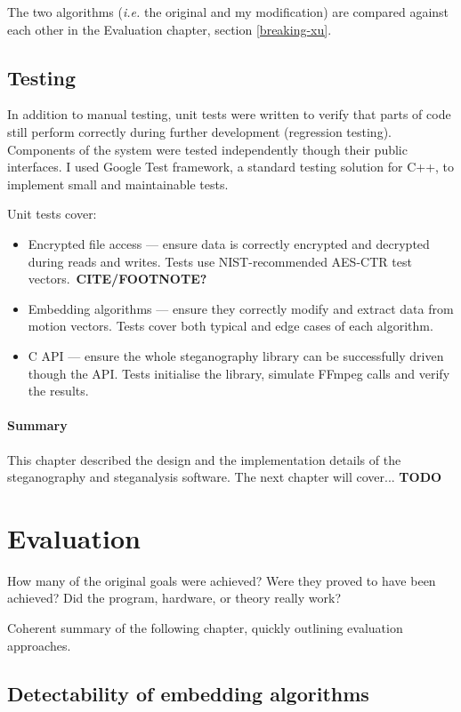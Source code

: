\documentclass[12pt,british,twoside,notitlepage,usenames,dvipsnames,hypens,final]{report}
\numberwithin{equation}{section}
\numberwithin{figure}{section}
\begin{document}
The two algorithms (\emph{i.e.} the original and my modification) are compared against each other in the Evaluation chapter, section \ref{breaking-xu}.

\section{Testing}

In addition to manual testing, unit tests were written to verify that parts of code  still perform correctly during further development (regression testing). Components of the system were tested independently though their public interfaces. I used Google Test framework, a standard testing solution for C++, to implement small and maintainable tests.

Unit tests cover:
\begin{itemize}
\item Encrypted file access --- ensure data is correctly encrypted and decrypted during reads and writes. Tests use NIST-recommended AES-CTR test vectors.~\textbf{CITE/FOOTNOTE?}
\item Embedding algorithms --- ensure they correctly modify and extract data from motion vectors. Tests cover both typical and edge cases of each algorithm.
\item C API --- ensure the whole steganography library can be successfully driven though the API. Tests initialise the library, simulate FFmpeg calls and verify the results. 
\end{itemize}

\bigskip\bigskip
\subsubsection*{Summary}
This chapter described the design and the implementation details of the steganography and steganalysis software. The next chapter will cover... \textbf{TODO}

\cleardoublepage
\chapter{Evaluation}

How many of the
original goals were achieved? Were they proved to have been achieved? Did the program,
hardware, or theory really work?

Coherent summary of the following chapter, quickly outlining evaluation approaches.

\section{Detectability of embedding algorithms}
\end{document}
